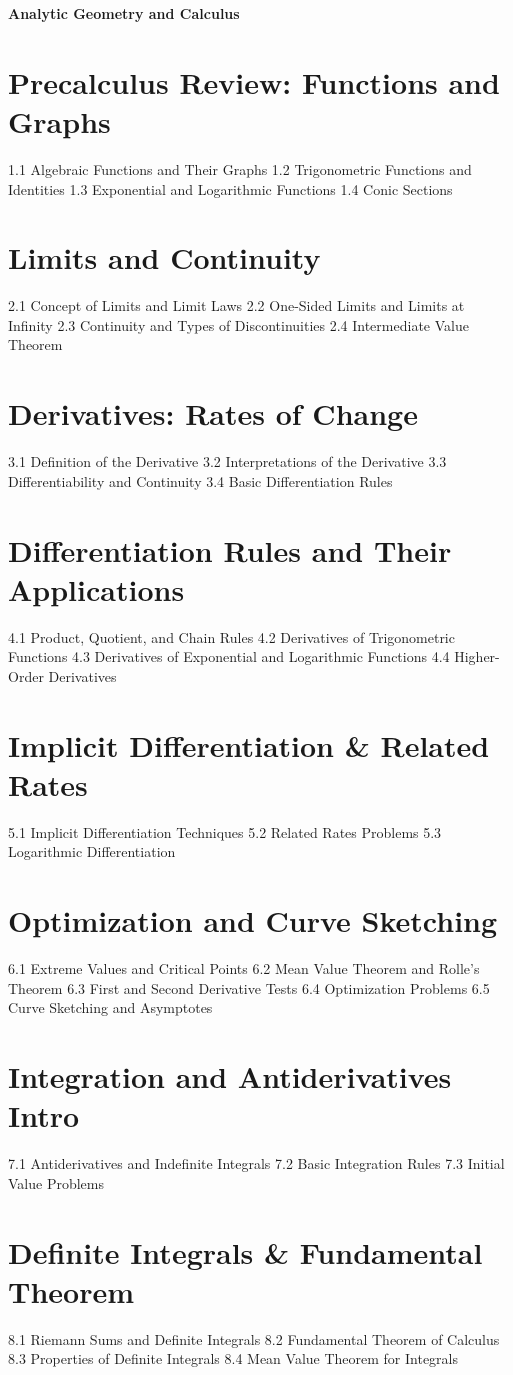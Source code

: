 {\LARGE \bf{Analytic Geometry and Calculus}}
\section{Precalculus Review: Functions and Graphs}
1.1 Algebraic Functions and Their Graphs
1.2 Trigonometric Functions and Identities
1.3 Exponential and Logarithmic Functions
1.4 Conic Sections
\section{Limits and Continuity}
2.1 Concept of Limits and Limit Laws
2.2 One-Sided Limits and Limits at Infinity
2.3 Continuity and Types of Discontinuities
2.4 Intermediate Value Theorem
\section{Derivatives: Rates of Change}
3.1 Definition of the Derivative
3.2 Interpretations of the Derivative
3.3 Differentiability and Continuity
3.4 Basic Differentiation Rules
\section{Differentiation Rules and Their Applications}
4.1 Product, Quotient, and Chain Rules
4.2 Derivatives of Trigonometric Functions
4.3 Derivatives of Exponential and Logarithmic Functions
4.4 Higher-Order Derivatives
\section{Implicit Differentiation \& Related Rates}
5.1 Implicit Differentiation Techniques
5.2 Related Rates Problems
5.3 Logarithmic Differentiation
\section{Optimization and Curve Sketching}
6.1 Extreme Values and Critical Points
6.2 Mean Value Theorem and Rolle's Theorem
6.3 First and Second Derivative Tests
6.4 Optimization Problems
6.5 Curve Sketching and Asymptotes
\section{Integration and Antiderivatives Intro}
7.1 Antiderivatives and Indefinite Integrals
7.2 Basic Integration Rules
7.3 Initial Value Problems
\section{Definite Integrals \& Fundamental Theorem}
8.1 Riemann Sums and Definite Integrals
8.2 Fundamental Theorem of Calculus
8.3 Properties of Definite Integrals
8.4 Mean Value Theorem for Integrals
